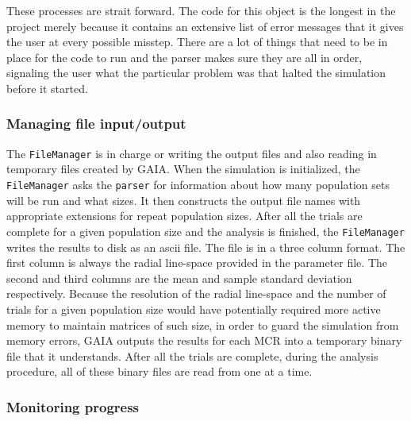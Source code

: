 \documentclass[10pt,a4paper,final]{article}
\numberwithin{equation}{section}
\begin{document}
\begin{multicols}{2}[]
				These processes are strait forward. The code for this object is
				the longest in the project merely because it contains an extensive list
				of error messages that it gives the user at every possible misstep. There
				are a lot of things that need to be in place for the code to run and the
				parser makes sure they are all in order, signaling the user what the
				particular problem was that halted the simulation before it started.

			\subsubsection{Managing file input/output}
				
				The \texttt{FileManager} is in charge or writing the output files and also
				reading in temporary files created by GAIA. When the simulation is initialized,
				the \texttt{FileManager} asks the \texttt{parser} for information about how
				many population sets will be run and what sizes. It then constructs the output
				file names with appropriate extensions for repeat population sizes. After all
				the trials are complete for a given population size and the analysis is
				finished, the \texttt{FileManager} writes the results to disk as an ascii file.
				The file is in a three column format. The first column is always the radial
				line-space provided in the parameter file. The second and third columns are
				the mean and sample standard deviation respectively. Because the resolution of
				the radial line-space and the number of trials for a given population size would
				have potentially required more active memory to maintain matrices of such size,
				in order to guard the simulation from memory errors, GAIA outputs the results
				for each MCR into a temporary binary file that it understands. After all the
				trials are complete, during the analysis procedure, all of these binary files
				are read from one at a time.

			\subsubsection{Monitoring progress}
				

\end{multicols}
\end{document}
